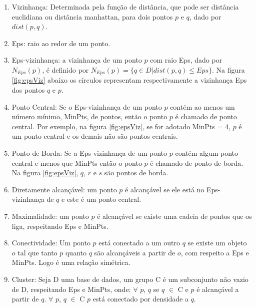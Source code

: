 \begin{enumerate}
	\item Vizinhança: Determinada pela função de distância, que pode ser distância euclidiana ou distância manhattan, para dois pontos ${p}$ e ${q}$, dado por ${dist(p,q)}$.
	\item Eps: raio ao redor de um ponto. 
	\item Eps-vizinhança: a vizinhança de um ponto ${p}$ com raio Eps, dado por ${N_{Eps}(p)}$, é definido por ${N_{Eps}(p) = \big\{ q \in D | dist(p, q)  \leqslant Eps\big\} }$. Na figura \ref{fig:epsViz} abaixo os círculos representam respectivamente a vizinhança Eps dos pontos ${q}$ e ${p}$.
	\item Ponto Central: Se o Eps-vizinhança de um ponto ${p}$ contém ao menos um número mínimo, MinPts, de pontos, então o ponto ${p}$ é chamado de ponto central.
	Por exemplo, na figura \ref{fig:epsViz}, se for adotado MinPts = 4, ${p}$ é um ponto central e os demais não são pontos centrais.
	\item Ponto de Borda: Se a Eps-vizinhança de um ponto ${p}$ contém algum ponto central e menos que MinPts então o ponto ${p}$ é chamado de ponto de borda. Na figura  \ref{fig:epsViz}, ${q}$, ${r}$ e ${s}$ são pontos de borda.
	\item Diretamente alcançável: um ponto ${p}$ é alcançável se ele está no Eps-vizinhança de ${q}$ e este é um ponto central.
	\item Maximalidade: um ponto ${p}$ é alcançável se existe uma cadeia de pontos que os liga, respeitando Eps e MinPts.
	\item Conectividade: Um ponto ${p}$ está conectado a um outro ${q}$ se existe um objeto ${o}$ tal que tanto ${p}$ quanto ${q}$ são alcançáveis a partir de ${o}$, com respeito a Eps e MinPts. Logo é uma relação simétrica.
	\item Cluster: Seja D uma base de dados, um grupo C é um subconjunto não vazio de D, respeitando Eps e MinPts, onde:
		\subitem ${\forall}$ ${p}$, ${q}$ se ${q}$ ${\in}$ C e ${p}$ é alcançável a partir de ${q}$.
		\subitem ${\forall}$ ${p}$, ${q}$ ${\in}$ C ${p}$ está conectado por densidade a ${q}$.
\end{enumerate}

\begin{figure}[!ht]
	\centering
\end{figure}

